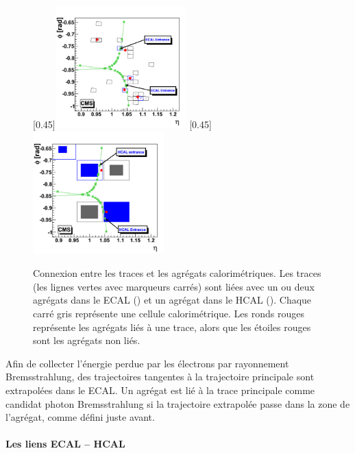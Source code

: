 \begin{figure}
  [0.45\textwidth]{\includegraphics[width=0.45\textwidth]{chapitre3/figs/pf_links_ecal.png}}\hfill
  [0.45\textwidth]{\includegraphics[width=0.45\textwidth]{chapitre3/figs/pf_links_hcal.png}}
  \caption{Connexion entre les traces et les agrégats calorimétriques. Les traces (les lignes vertes avec marqueurs carrés) sont liées avec un ou deux agrégats dans le ECAL () et un agrégat dans le HCAL (). Chaque carré gris représente une cellule calorimétrique. Les ronds rouges représente les agrégats liés à une trace, alors que les étoiles rouges sont les agrégats non liés.}
  \label{fig:pf_links}
\end{figure}

Afin de collecter l'énergie perdue par les électrons par rayonnement Bremsstrahlung, des trajectoires tangentes à la trajectoire principale sont extrapolées dans le ECAL. Un agrégat est lié à la trace principale comme candidat photon Bremsstrahlung si la trajectoire extrapolée passe dans la zone de l'agrégat, comme défini juste avant.

\paragraph{Les liens ECAL – HCAL}

